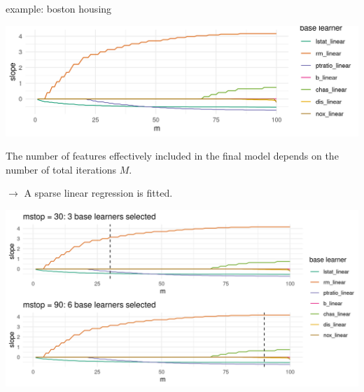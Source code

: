 \documentclass[11pt,compress,t,notes=noshow, xcolor=table]{beamer}
\begin{document}
\begin{vbframe}{example: boston housing}
\vfill

\begin{center}
\includegraphics[width = \textwidth]{figure/compboost-illustration-1.png}
\end{center}

\framebreak


The number of features effectively included in the final model depends on the
number of total iterations $M$.

\vfill

$\rightarrow$ A sparse linear regression is fitted.

\vfill

\includegraphics[width = \textwidth]{figure/compboost-illustration-2.png}

\end{vbframe}


\fi

\endlecture
\end{document}
